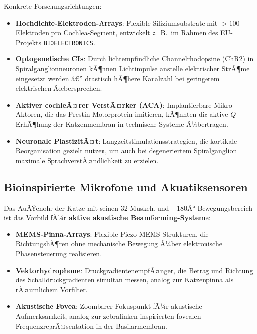 ﻿\documentclass[12pt,a4paper,titlepage]{report}
\begin{document}
Konkrete Forschungsrichtungen:
\begin{itemize}[leftmargin=2em]
    \item \textbf{Hochdichte-Elektroden-Arrays}: Flexible Siliziumsubstrate mit
        $> 100$ Elektroden pro Cochlea-Segment, entwickelt z.~B.\ im Rahmen des
        EU-Projekts \texttt{BIOELECTRONICS}.
    \item \textbf{Optogenetische CIs}: Durch lichtempfindliche Channelrhodopsine
        (ChR2) in Spiralganglionneuronen kÃ¶nnen Lichtimpulse anstelle elektrischer
        StrÃ¶me eingesetzt werden â€” drastisch hÃ¶here Kanalzahl bei geringerem
        elektrischen Ãœbersprechen.
    \item \textbf{Aktiver cochleÃ¤rer VerstÃ¤rker (ACA)}: Implantierbare
        Mikro-Aktoren, die das Prestin-Motorprotein imitieren, kÃ¶nnten die
        aktive $Q$-ErhÃ¶hung der Katzenmembran in technische Systeme Ã¼bertragen.
    \item \textbf{Neuronale PlastizitÃ¤t}: Langzeitstimulationsstrategien, die
        kortikale Reorganisation gezielt nutzen, um auch bei degeneriertem
        Spiralganglion maximale SprachverstÃ¤ndlichkeit zu erzielen.
\end{itemize}

\subsection{Bioinspirierte Mikrofone und Akuatiksensoren}

Das AuÃŸenohr der Katze mit seinen 32 Muskeln und $\pm 180Â°$ Bewegungsbereich
ist das Vorbild fÃ¼r \textbf{aktive akustische Beamforming-Systeme}:
\begin{itemize}[leftmargin=2em]
    \item \textbf{MEMS-Pinna-Arrays}: Flexible Piezo-MEMS-Strukturen, die
        RichtungshÃ¶ren ohne mechanische Bewegung Ã¼ber elektronische Phasensteuerung
        realisieren.
    \item \textbf{Vektorhydrophone}: DruckgradientenempfÃ¤nger, die Betrag und
        Richtung des Schalldruckgradienten simultan messen, analog zur
        Katzenpinna als rÃ¤umlichem Vorfilter.
    \item \textbf{Akustische Fovea}: Zoombarer Fokuspunkt fÃ¼r akustische
        Aufmerksamkeit, analog zur zebrafinken-inspirierten fovealen
        FrequenzreprÃ¤sentation in der Basilarmembran.
\end{itemize}

\end{document}
